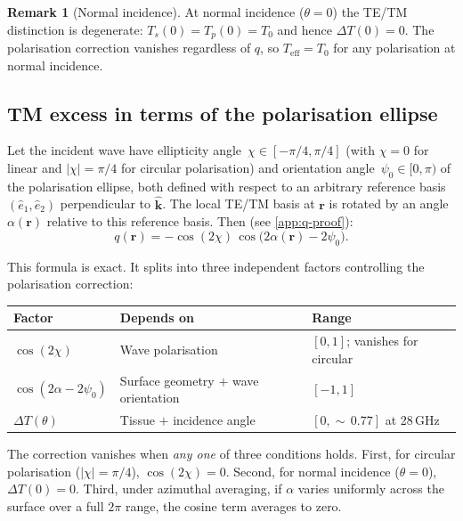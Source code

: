 \documentclass[11pt,a4paper]{article}
\theoremstyle{definition}      %
\newtheorem{remark}[remark]{Remark}
\newcommand{\khat}{\hat{\bm{k}}}
\newcommand{\rr}{\mathbf{r}}
\newcommand{\Teff}{T_{\mathrm{eff}}}
\begin{document}
\begin{remark}[Normal incidence]
At normal incidence ($\theta=0$) the TE/TM distinction is degenerate:
$T_s(0)=T_p(0)=T_0$ and hence $\Delta T(0)=0$.  The polarisation
correction vanishes regardless of $q$, so $\Teff=T_0$ for any
polarisation at normal incidence.
\end{remark}

\subsection{TM excess in terms of the polarisation ellipse}
\label{sec:q-ellipse}

Let the incident wave have ellipticity angle~$\chi\in[-\pi/4,\pi/4]$
(with $\chi=0$ for linear and $|\chi|=\pi/4$ for circular
polarisation) and orientation angle~$\psi_0\in[0,\pi)$ of the
polarisation ellipse, both defined with respect to an arbitrary
reference basis $(\hat{e}_1,\hat{e}_2)$ perpendicular to $\khat$.
The local TE/TM basis at $\rr$ is rotated by an angle~$\alpha(\rr)$
relative to this reference basis.  Then (see \cref{app:q-proof}):
\begin{equation}\label{eq:q-exact}
  \boxed{q(\rr)
    = -\cos(2\chi)\,\cos\!\bigl(2\alpha(\rr)-2\psi_0\bigr).}
\end{equation}

This formula is exact. It splits into three independent factors
controlling the polarisation correction:

\begin{center}
\begin{tabular}{lll}
\toprule
Factor & Depends on & Range \\
\midrule
$\cos(2\chi)$ & Wave polarisation &
  $[0,1]$; vanishes for circular \\
$\cos(2\alpha-2\psi_0)$ & Surface geometry $+$ wave orientation &
  $[-1,1]$ \\
$\Delta T(\theta)$ & Tissue $+$ incidence angle &
  $[0,{\sim}\,0.77]$ at 28\,GHz \\
\bottomrule
\end{tabular}
\end{center}

The correction vanishes when \emph{any one} of three conditions holds.
First, for circular polarisation ($|\chi|=\pi/4$), $\cos(2\chi)=0$.
Second, for normal incidence ($\theta=0$), $\Delta T(0)=0$.
Third, under azimuthal averaging, if $\alpha$ varies uniformly across the
surface over a full $2\pi$ range, the cosine term averages to zero.
\end{document}
